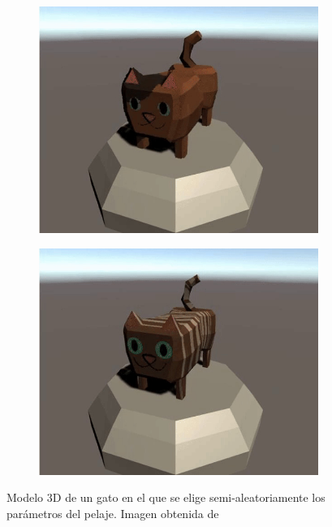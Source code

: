 \begin{figure}[H]
\begin{center}
\begin{subfigure}[b]{0.24\textwidth}
            \includegraphics[width=\textwidth]{img/cat3.jpg}
        \end{subfigure}
        \hfill
        \begin{subfigure}[b]{0.24\textwidth}
            \includegraphics[width=\textwidth]{img/cat4.jpg}
        \end{subfigure}
        \caption{Modelo 3D de un gato en el que se elige semi-aleatoriamente los parámetros del pelaje. Imagen obtenida de \cite{collins2017}}
    \end{center}
\end{figure}

